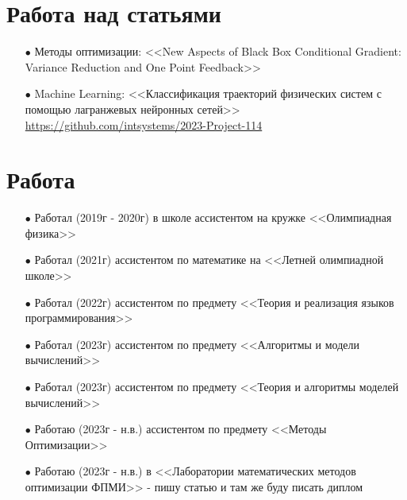 \documentclass[a4paper,12pt]{article}
\begin{document}
\section*{Работа над статьями}

    \begin{enumerate}

        \item[$\bullet$] Методы оптимизации: <<New Aspects of Black Box Conditional Gradient: Variance Reduction and One Point Feedback>>

        \item[$\bullet$] Machine Learning: <<Классификация траекторий физических систем с помощью лагранжевых нейронных сетей>> \url{https://github.com/intsystems/2023-Project-114}

    \end{enumerate}

\section*{Работа}

    \begin{enumerate}

        \item[$\bullet$]  Работал (2019г - 2020г) в школе ассистентом на кружке <<Олимпиадная физика>>

        \item[$\bullet$] Работал (2021г) ассистентом по математике на <<Летней олимпиадной школе>>

        \item[$\bullet$] Работал (2022г) ассистентом по предмету <<Теория и реализация языков программирования>>

        \item[$\bullet$] Работал (2023г) ассистентом по предмету <<Алгоритмы и модели вычислений>>

        \item[$\bullet$] Работал (2023г) ассистентом по предмету <<Теория и алгоритмы моделей вычислений>>
        
        \item[$\bullet$] Работаю (2023г - н.в.) ассистентом по предмету <<Методы Оптимизации>>
        
        \item[$\bullet$] Работаю (2023г - н.в.) в <<Лаборатории математических методов оптимизации ФПМИ>> - пишу статью и там же буду писать диплом
        
    \end{enumerate}
\end{document}
